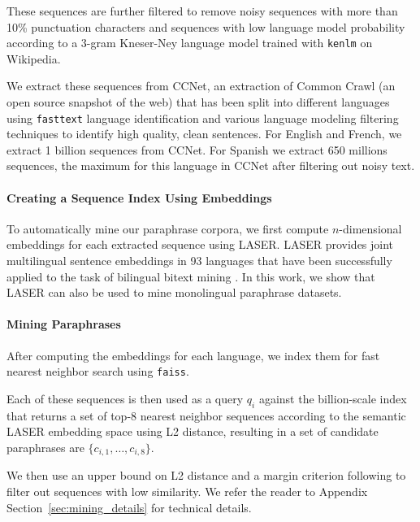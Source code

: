 \documentclass[11pt]{article}
\newcommand{\ccnet}{CCNet\xspace}
\newcommand{\laser}{LASER\xspace}
\begin{document}
These sequences are further filtered to remove noisy sequences with more than 10\% punctuation characters and sequences with low language model probability  according to a 3-gram Kneser-Ney language model trained with \texttt{kenlm} \cite{heafield2011kenlm} on Wikipedia.

We extract these sequences from \ccnet \cite{wenzek2019ccnet}, an extraction of Common Crawl (an open source snapshot of the web) that has been split into different languages using \texttt{fasttext} language identification \cite{joulin2017bag} and various language modeling filtering techniques to identify high quality, clean sentences. For English and French, we extract 1 billion sequences from \ccnet. For Spanish we extract 650 millions sequences, the maximum for this language in \ccnet after filtering out noisy text.

\paragraph{Creating a Sequence Index Using Embeddings}
To automatically mine our paraphrase corpora, we first compute $n$-dimensional embeddings for each extracted sequence using \laser \cite{artetxe2019massively}. \laser provides joint multilingual sentence embeddings in 93 languages that have been successfully applied to the task of bilingual bitext mining \cite{schwenk2019ccmatrix}. In this work, we show that \laser can also be used to mine monolingual paraphrase datasets.



\paragraph{Mining Paraphrases}

After computing the embeddings for each language, we index them for fast nearest neighbor search using \texttt{faiss}. 

Each of these sequences is then used as a query $q_i$ against the billion-scale index that returns a set of top-8 nearest neighbor sequences according to the semantic \laser embedding space using L2 distance, resulting in a set of candidate paraphrases are $\{c_{i,1}, \ldots, c_{i,8}\}$.

We then use an upper bound on L2 distance and a margin criterion following \cite{artetxe-schwenk-2019-margin} to filter out sequences with low similarity.
We refer the reader to Appendix Section~\ref{sec:mining_details} for technical details.
\end{document}
